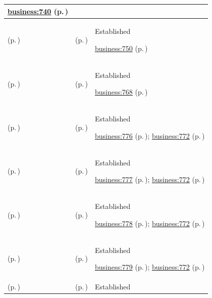 \begin{longtable}{|>{\raggedright\arraybackslash}p{0.27\TableWidth}|>{\raggedright\arraybackslash}p{0.27\TableWidth}|>{\raggedright\arraybackslash}p{0.46\TableWidth}|}
 \hyperref[rad:business:740]{business:740} (p.\,\pageref{rad:business:740})\\\hline
\nameref{cap:bc-connected-health-services} (p.\,\pageref{cap:bc-connected-health-services}) & \nameref{cap:bc-digital-communication-channel} (p.\,\pageref{cap:bc-digital-communication-channel}) & Established

 \hyperref[rad:business:750]{business:750} (p.\,\pageref{rad:business:750})\\\hline
\nameref{cap:bc-security-privacy-digital-trust} (p.\,\pageref{cap:bc-security-privacy-digital-trust}) & \nameref{cap:bc-digital-identity-access-governance} (p.\,\pageref{cap:bc-digital-identity-access-governance}) & Established

 \hyperref[rad:business:768]{business:768} (p.\,\pageref{rad:business:768})\\\hline
\nameref{cap:bc-digital-identity-access-governance} (p.\,\pageref{cap:bc-digital-identity-access-governance}) & \nameref{cap:bc-identity-assurance} (p.\,\pageref{cap:bc-identity-assurance}) & Established

 \hyperref[rad:business:774]{business:776} (p.\,\pageref{rad:business:774}); \hyperref[rad:business:772]{business:772} (p.\,\pageref{rad:business:772})\\\hline
\nameref{cap:bc-digital-identity-access-governance} (p.\,\pageref{cap:bc-digital-identity-access-governance}) & \nameref{cap:bc-identity-modelling-interoperability} (p.\,\pageref{cap:bc-identity-modelling-interoperability}) & Established

 \hyperref[rad:business:774]{business:777} (p.\,\pageref{rad:business:774}); \hyperref[rad:business:772]{business:772} (p.\,\pageref{rad:business:772})\\\hline
\nameref{cap:bc-digital-identity-access-governance} (p.\,\pageref{cap:bc-digital-identity-access-governance}) & \nameref{cap:bc-identity-qualification-control} (p.\,\pageref{cap:bc-identity-qualification-control}) & Established

 \hyperref[rad:business:774]{business:778} (p.\,\pageref{rad:business:774}); \hyperref[rad:business:772]{business:772} (p.\,\pageref{rad:business:772})\\\hline
\nameref{cap:bc-digital-identity-access-governance} (p.\,\pageref{cap:bc-digital-identity-access-governance}) & \nameref{cap:bc-identity-identification-authentication} (p.\,\pageref{cap:bc-identity-identification-authentication}) & Established

 \hyperref[rad:business:774]{business:779} (p.\,\pageref{rad:business:774}); \hyperref[rad:business:772]{business:772} (p.\,\pageref{rad:business:772})\\\hline
\nameref{cap:bc-digital-identity-access-governance} (p.\,\pageref{cap:bc-digital-identity-access-governance}) & \nameref{cap:bc-access-control-context-management} (p.\,\pageref{cap:bc-access-control-context-management}) & Established


\end{longtable}
